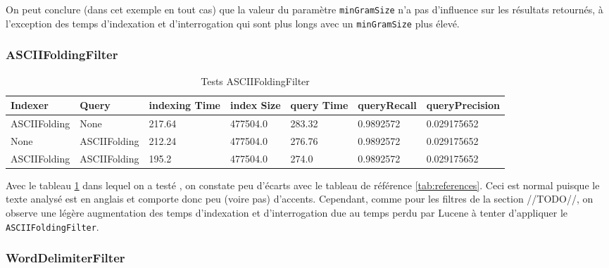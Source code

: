 On peut conclure (dans cet exemple en tout cas) que la valeur du paramètre \texttt{minGramSize} n’a pas d'influence sur les résultats retournés, à l’exception des temps d’indexation et d’interrogation qui sont plus longs avec un \texttt{minGramSize} plus élevé.

\subsubsection{ASCIIFoldingFilter}

\begin{table}[!htbp]
    \hspace{-2cm}
                \begin{tabular}{|p{2cm}|p{2cm}|p{2cm}|p{2cm}|p{2.5cm}|p{2.5cm}|p{2.5cm}|}
                    \hline
                    \textbf{Indexer} & \textbf{Query} & \textbf{indexing Time} & \textbf{index Size} & \textbf{query Time} & \textbf{queryRecall} & \textbf{queryPrecision}\\
                    \hline
ASCIIFolding & None & 217.64 & 477504.0 & 283.32 & 0.9892572 & 0.029175652\\
		\hline
None & ASCIIFolding & 212.24 & 477504.0 & 276.76 & 0.9892572 & 0.029175652\\
		\hline
ASCIIFolding & ASCIIFolding & 195.2 & 477504.0 & 274.0 & 0.9892572 & 0.029175652\\
                    \hline
                \end{tabular}
                \caption{Tests ASCIIFoldingFilter}
                \label{tab:tests_ASCIIFoldingFilter}
            \end{table}

Avec le tableau \ref{tab:tests_ASCIIFoldingFilter} dans lequel on a testé , on constate peu d’écarts avec le tableau de référence \ref{tab:references}. Ceci est normal puisque le texte analysé est en anglais et comporte donc peu (voire pas) d’accents. Cependant, comme pour les filtres de la section //TODO//, on observe une légère augmentation des temps d’indexation et d’interrogation due au temps perdu par Lucene à tenter d’appliquer le \texttt{ASCIIFoldingFilter}.

\subsubsection{WordDelimiterFilter}

